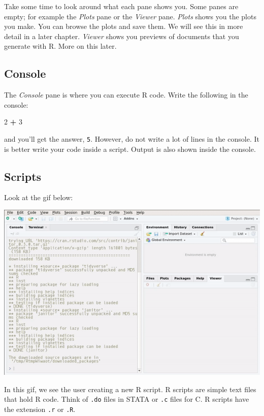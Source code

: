 \documentclass[]{gitbook}
\newenvironment{Shaded}{\begin{snugshade}}{\end{snugshade}}
\newcommand{\DecValTok}[1]{\textcolor[rgb]{0.00,0.00,0.81}{#1}}
\newcommand{\OperatorTok}[1]{\textcolor[rgb]{0.81,0.36,0.00}{\textbf{#1}}}
\newcommand{\StringTok}[1]{\textcolor[rgb]{0.31,0.60,0.02}{#1}}
\begin{document}
Take some time to look around what each pane shows you. Some panes are empty; for example the \emph{Plots}
pane or the \emph{Viewer} pane. \emph{Plots} shows you the plots you make. You can browse the plots and save
them. We will see this in more detail in a later chapter. \emph{Viewer} shows you previews of documents
that you generate with R. More on this later.

\hypertarget{console}{%
\subsection{Console}\label{console}}

The \emph{Console} pane is where you can execute R code. Write the following in the console:

\begin{Shaded}
\begin{Highlighting}[]
\DecValTok{2} \OperatorTok{+}\StringTok{ }\DecValTok{3}
\end{Highlighting}
\end{Shaded}

and you'll get the answer, \texttt{5}. However, do not write a lot of lines in the console. It is better
write your code inside a script. Output is also shown inside the console.

\hypertarget{scripts}{%
\subsection{Scripts}\label{scripts}}

Look at the gif below:

\includegraphics{pics/rstudio_new_script.gif}

In this gif, we see the user creating a new R script. R scripts are simple text files that hold R
code. Think of \texttt{.do} files in STATA or \texttt{.c} files for C. R scripts have the extension \texttt{.r} or \texttt{.R}.
\end{document}
